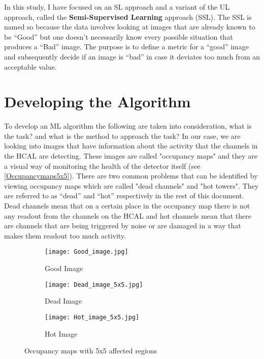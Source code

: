 In this study, I have focused on an SL approach and a variant of the UL approach, called the \textbf{Semi-Supervised Learning} approach (SSL). The SSL is named so because the data involves looking at images that are already known to be “Good” but one doesn’t necessarily know every possible situation that produces a “Bad” image. The purpose is to define a metric for a “good” image and subsequently decide if an image is “bad” in case it deviates too much from an acceptable value.



\section{Developing the Algorithm}

To develop an ML algorithm the following are taken into consideration, what is the task? and what is the method to approach the task? In our case, we are looking into images that have information about the activity that the channels in the HCAL are detecting. These images are called "occupancy maps" and they are a visual way of monitoring the health of the detector itself (see \autoref{Occupancymaps5x5}). There are two common problems that can be identified by viewing occupancy maps which are called "dead channels" and "hot towers". They are referred to as “dead” and “hot” respectively in the rest of this document. Dead channels mean that on a certain place in the occupancy map there is not any readout from the channels on the HCAL and hot channels mean that there are channels that are being triggered by noise or are damaged in a way that makes them readout too much activity.

\begin{figure}[h]
\begin{subfigure}{.3\textwidth}
	\centering
	\texttt{[image: Good\_image.jpg]}
	\caption{Good Image\label{Goodimage}}
\end{subfigure}
%
\begin{subfigure}{.3\linewidth}
	\centering
	\texttt{[image: Dead\_image\_5x5.jpg]}
	\caption{Dead Image \label{Deadimage}}
\end{subfigure}
%
\begin{subfigure}{0.3\linewidth}
	\centering
	\texttt{[image: Hot\_image\_5x5.jpg]}
	\caption{Hot Image \label{Hotimage}}
\end{subfigure}
\vspace{1cm}
\caption{Occupancy maps with 5x5 affected regions \label{Occupancymaps5x5}}
\end{figure}


